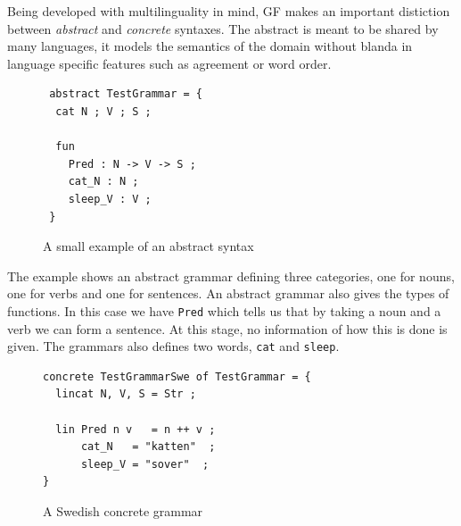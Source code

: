 \documentclass{report}
\begin{document}
Being developed with multilinguality in mind, GF makes an important distiction between
\textit{abstract} and \textit{concrete} syntaxes. The abstract is meant to be
shared by many languages, it models the semantics of the domain without blanda in
language specific features such as agreement or word order.

\begin{figure}[h]
\begin{verbatim}
 abstract TestGrammar = {
  cat N ; V ; S ;

  fun 
    Pred : N -> V -> S ;
    cat_N : N ;
    sleep_V : V ;
 }
\end{verbatim}
\caption{A small example of an abstract syntax}
\end{figure}

The example shows an abstract grammar defining three categories, %
one for nouns, one for verbs and one for sentences. An abstract grammar also gives
the types of functions. In this case we have \verb|Pred| which
tells us that by taking a noun and a verb we can form a sentence. At this stage, 
no information of how this is done is given. The grammars also defines two words,
\verb|cat| and \verb|sleep|. 

\begin{figure}[h]
\begin{verbatim}
concrete TestGrammarSwe of TestGrammar = {
  lincat N, V, S = Str ;
   
  lin Pred n v   = n ++ v ;
      cat_N   = "katten"  ;
      sleep_V = "sover"  ;
}
\end{verbatim}
\caption{A Swedish concrete grammar}
\label{fig:gfSweCnc1}
\end{figure}
\end{document}
